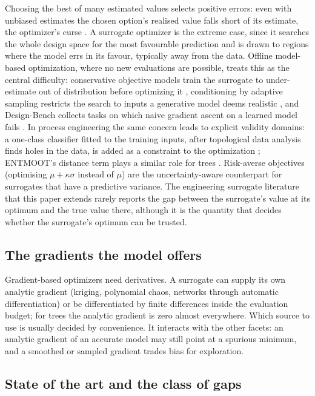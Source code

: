 Choosing the best of many estimated values selects positive errors: even with unbiased estimates the chosen option's
realised value falls short of its estimate, the optimizer's curse \cite{smith2006optimizer}. A surrogate optimizer is
the extreme case, since it searches the whole design space for the most favourable prediction and is drawn to regions
where the model errs in its favour, typically away from the data. Offline model-based optimization, where no new
evaluations are possible, treats this as the central difficulty: conservative objective models train the surrogate to
under-estimate out of distribution before optimizing it \cite{trabucco2021conservative}, conditioning by adaptive
sampling restricts the search to inputs a generative model deems realistic \cite{brookes2019conditioning}, and
Design-Bench collects tasks on which naive gradient ascent on a learned model fails \cite{trabucco2022design}. In
process engineering the same concern leads to explicit validity domains: a one-class classifier fitted to the training
inputs, after topological data analysis finds holes in the data, is added as a constraint to the optimization
\cite{schweidtmann2022obey}; ENTMOOT's distance term plays a similar role for trees \cite{thebelt2021entmoot}.
Risk-averse objectives (optimising $\mu + \kappa\sigma$ instead of $\mu$) are the uncertainty-aware counterpart for
surrogates that have a predictive variance. The engineering surrogate literature that this paper extends rarely
reports the gap between the surrogate's value at its optimum and the true value there, although it is the quantity
that decides whether the surrogate's optimum can be trusted.

\subsection{The gradients the model offers}

Gradient-based optimizers need derivatives. A surrogate can supply its own analytic gradient (kriging, polynomial
chaos, networks through automatic differentiation) or be differentiated by finite differences inside the evaluation
budget; for trees the analytic gradient is zero almost everywhere. Which source to use is usually decided by
convenience. It interacts with the other facets: an analytic gradient of an accurate model may still point at a
spurious minimum, and a smoothed or sampled gradient trades bias for exploration.

\subsection{State of the art and the class of gaps}

